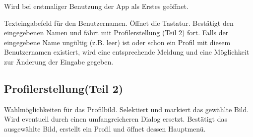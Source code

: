 Wird bei erstmaliger Benutzung der App als Erstes geöffnet.
\begin{requirements}
 Texteingabefeld für den Benutzernamen. Öffnet die Tastatur.
 Bestätigt den eingegebenen Namen und fährt mit Profilerstellung (Teil 2) fort. Falls der eingegebene Name ungültig (z.B. leer) ist oder schon ein Profil mit diesem Benutzernamen existiert, wird eine entsprechende Meldung und eine Möglichkeit zur Änderung der Eingabe gegeben.
\end{requirements}

\subsection{Profilerstellung(Teil 2)}

\begin{center}
\setlength\fboxsep{20pt}
\setlength\fboxrule{1pt}
\end{center}

\begin{requirements}
 Wahlmöglichkeiten für das Profilbild. Selektiert und markiert das gewählte Bild. Wird eventuell durch einen umfangreicheren Dialog ersetzt.
 Bestätigt das ausgewählte Bild, erstellt ein Profil und öffnet dessen Hauptmenü.
\end{requirements}


